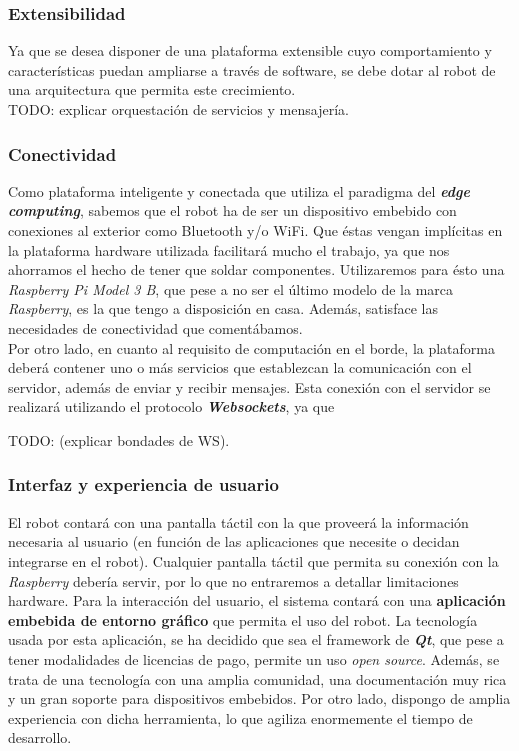 \subsubsection{Extensibilidad}

Ya que se desea disponer de una plataforma extensible cuyo comportamiento y características puedan ampliarse a través de software, se debe dotar al robot de una arquitectura que permita este crecimiento.\\

TODO: explicar orquestación de servicios y mensajería.

\subsubsection{Conectividad}

Como plataforma inteligente y conectada que utiliza el paradigma del \textbf{\textit{edge computing}}, sabemos que el robot ha de ser un dispositivo embebido con conexiones al exterior como Bluetooth y/o WiFi. Que éstas vengan implícitas en la plataforma hardware utilizada facilitará mucho el trabajo, ya que nos ahorramos el hecho de tener que soldar componentes. Utilizaremos para ésto una \textit{Raspberry Pi Model 3 B}, que pese a no ser el último modelo de la marca \textit{Raspberry}, es la que tengo a disposición en casa. Además, satisface las necesidades de conectividad que comentábamos.\\

Por otro lado, en cuanto al requisito de computación en el borde, la plataforma deberá contener uno o más servicios que establezcan la comunicación con el servidor, además de enviar y recibir mensajes. Esta conexión con el servidor se realizará utilizando el protocolo \textbf{\textit{Websockets}}, ya que 

TODO: (explicar bondades de WS). 

\subsubsection{Interfaz y experiencia de usuario}

El robot contará con una pantalla táctil con la que proveerá la información necesaria al usuario (en función de las aplicaciones que necesite o decidan integrarse en el robot). Cualquier pantalla táctil que permita su conexión con la \textit{Raspberry} debería servir, por lo que no entraremos a detallar limitaciones hardware. Para la interacción del usuario, el sistema contará con una \textbf{aplicación embebida de entorno gráfico} que permita el uso del robot. La tecnología usada por esta aplicación, se ha decidido que sea el framework de \textbf{\textit{Qt}}, que pese a tener modalidades de licencias de pago, permite un uso \textit{open source}. Además, se trata de una tecnología con una amplia comunidad, una documentación muy rica y un gran soporte para dispositivos embebidos. Por otro lado, dispongo de amplia experiencia con dicha herramienta, lo que agiliza enormemente el tiempo de desarrollo.\\

